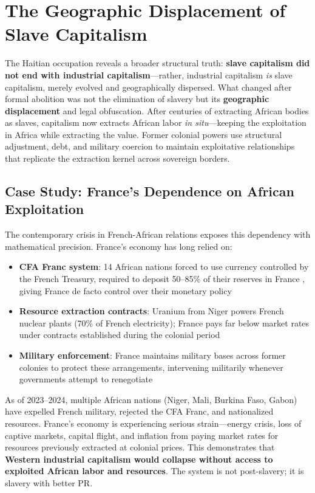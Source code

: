 \documentclass[12pt,openany]{book}
\begin{document}
\section{The Geographic Displacement of Slave Capitalism}

The Haitian occupation reveals a broader structural truth: \textbf{slave capitalism did not end with industrial capitalism}---rather, industrial capitalism \textit{is} slave capitalism, merely evolved and geographically dispersed. What changed after formal abolition was not the elimination of slavery but its \textbf{geographic displacement} and legal obfuscation. After centuries of extracting African bodies as slaves, capitalism now extracts African labor \textit{in situ}---keeping the exploitation in Africa while extracting the value. Former colonial powers use structural adjustment, debt, and military coercion to maintain exploitative relationships that replicate the extraction kernel across sovereign borders.

\subsection{Case Study: France's Dependence on African Exploitation}

The contemporary crisis in French-African relations exposes this dependency with mathematical precision. France's economy has long relied on:

\begin{itemize}
    \item \textbf{CFA Franc system}: 14 African nations forced to use currency controlled by the French Treasury, required to deposit 50--85\% of their reserves in France \cite{pigeaud}, giving France de facto control over their monetary policy
    \item \textbf{Resource extraction contracts}: Uranium from Niger powers French nuclear plants (70\% of French electricity); France pays far below market rates under contracts established during the colonial period
    \item \textbf{Military enforcement}: France maintains military bases across former colonies to protect these arrangements, intervening militarily whenever governments attempt to renegotiate
\end{itemize}

As of 2023--2024, multiple African nations (Niger, Mali, Burkina Faso, Gabon) have expelled French military, rejected the CFA Franc, and nationalized resources. France's economy is experiencing serious strain---energy crisis, loss of captive markets, capital flight, and inflation from paying market rates for resources previously extracted at colonial prices. This demonstrates that \textbf{Western industrial capitalism would collapse without access to exploited African labor and resources}. The system is not post-slavery; it is slavery with better PR.
\end{document}
